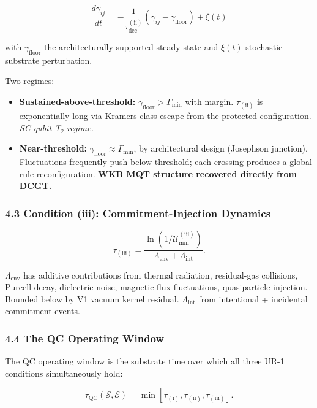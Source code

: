 \documentclass[
  11pt,
  a4paper,
]{article}
\providecommand{\tightlist}{%
  \setlength{\itemsep}{0pt}\setlength{\parskip}{0pt}}
\begin{document}
\[
\frac{d\gamma_{ij}}{dt} = -\frac{1}{\tau_{\mathrm{dec}}^{(\mathrm{ii})}}(\gamma_{ij} - \gamma_{\mathrm{floor}}) + \xi(t)
\]

with \(\gamma_{\mathrm{floor}}\) the architecturally-supported
steady-state and \(\xi(t)\) stochastic substrate perturbation.

Two regimes:

\begin{itemize}
\tightlist
\item
  \textbf{Sustained-above-threshold:}
  \(\gamma_{\mathrm{floor}} > \Gamma_{\mathrm{min}}\) with margin.
  \(\tau_{(\mathrm{ii})}\) is exponentially long via Kramers-class
  escape from the protected configuration. \emph{SC qubit T₂ regime.}
\item
  \textbf{Near-threshold:}
  \(\gamma_{\mathrm{floor}} \approx \Gamma_{\mathrm{min}}\), by
  architectural design (Josephson junction). Fluctuations frequently
  push below threshold; each crossing produces a global rule
  reconfiguration. \textbf{WKB MQT structure recovered directly from
  DCGT.}
\end{itemize}

\subsubsection{4.3 Condition (iii): Commitment-Injection
Dynamics}\label{condition-iii-commitment-injection-dynamics}

\[
\tau_{(\mathrm{iii})} = \frac{\ln(1/\mathcal{U}_{\mathrm{min}}^{(\mathrm{iii})})}{\Lambda_{\mathrm{env}} + \Lambda_{\mathrm{int}}}.
\]

\(\Lambda_{\mathrm{env}}\) has additive contributions from thermal
radiation, residual-gas collisions, Purcell decay, dielectric noise,
magnetic-flux fluctuations, quasiparticle injection. Bounded below by V1
vacuum kernel residual. \(\Lambda_{\mathrm{int}}\) from intentional +
incidental commitment events.

\subsubsection{4.4 The QC Operating
Window}\label{the-qc-operating-window}

The QC operating window is the substrate time over which all three UR-1
conditions simultaneously hold:

\[
\boxed{\;\tau_{\mathrm{QC}}(\mathcal{S}, \mathcal{E}) = \min\!\left[\tau_{(\mathrm{i})}, \tau_{(\mathrm{ii})}, \tau_{(\mathrm{iii})}\right].\;}
\]
\end{document}

